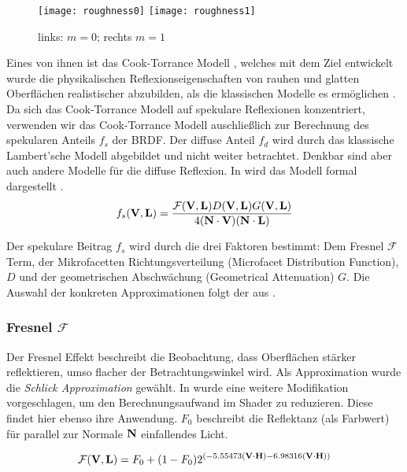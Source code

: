 \begin{figure}
	\label{fig:microfacet}
	\texttt{[image: roughness0]}
	\texttt{[image: roughness1]}
	\caption[Rauheit]{links: $m = 0$; rechts $m = 1$}
\end{figure}

Eines von ihnen ist das Cook-Torrance Modell \parencite{Cook1981}, welches mit dem Ziel entwickelt wurde die physikalischen Reflexionseigenschaften von rauhen und glatten Oberflächen realistischer abzubilden, als die klassischen Modelle es ermöglichen \parencite[Seite 40]{Ngan2004}. Da sich das Cook-Torrance Modell auf spekulare Reflexionen konzentriert, verwenden wir das Cook-Torrance Modell auschließlich zur Berechnung des spekularen Anteils $f_s$ der BRDF. Der diffuse Anteil $f_d$ wird durch das klassische Lambert'sche Modell abgebildet und nicht weiter betrachtet. Denkbar sind aber auch andere Modelle für die diffuse Reflexion. In  wird das Modell formal dargestellt
.
\begin{align}
	\label{eq:cook-torrance-model}
	f_s(\mathbf V,\mathbf L) = \frac{\mathcal{F}(\mathbf V,\mathbf L)D(\mathbf V,\mathbf L)G(\mathbf V,\mathbf L)}{4(\mathbf N \cdot \mathbf V)(\mathbf N \cdot \mathbf L)}
\end{align}

Der spekulare Beitrag $f_s$ wird durch die drei Faktoren bestimmt: Dem Fresnel $\mathcal{F}$ Term, der Mikrofacetten Richtungsverteilung (Microfacet Distribution Function), $D$ und der geometrischen Abschwächung (Geometrical Attenuation) $G$. Die Auswahl der konkreten Approximationen folgt der aus \cite[Seite 3]{Karis2013}.

\subsubsection[Fresnel]{Fresnel $\mathcal{F}$}
Der Fresnel Effekt beschreibt die Beobachtung, dass Oberflächen stärker reflektieren, umso flacher der Betrachtungswinkel wird. Als Approximation wurde die \textit{Schlick Approximation} \parencite{Schlick1994} gewählt. In \cite{Lagarde2012} wurde eine weitere Modifikation vorgeschlagen, um den Berechnungsaufwand im Shader zu reduzieren. Diese findet hier ebenso ihre Anwendung. $F_0$ beschreibt die Reflektanz (als Farbwert) für parallel zur Normale $\mathbf N$ einfallendes Licht.

\begin{align}
	\label{eq:fresnel-schlick}
	\mathcal F(\mathbf V,\mathbf L) = F_0  + (1 - F_0) 2^{(-5.55473 (\mathbf V \cdot \mathbf H) - 6.98316 (\mathbf V \cdot \mathbf H))}
\end{align}


